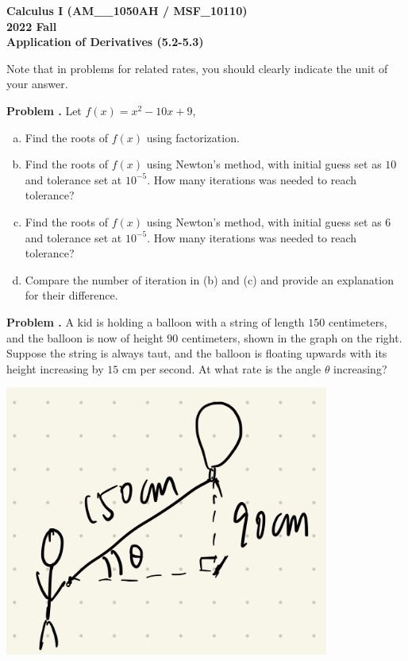 \documentclass[11pt,letterpaper]{article}
\newcounter{problem}
\newcommand{\problem}{
	\stepcounter{problem}%
	\noindent \textbf{Problem \theproblem. }%
}
\begin{document}
\noindent\textbf{\large Calculus I (AM\_\_1050AH / MSF\_10110) \\ 2022 Fall \\ Application of Derivatives (5.2-5.3)}

\bigskip

\noindent Note that in problems for related rates, you should clearly indicate the unit of your answer. 

\bigskip

\problem Let $f(x) = x^2 - 10x + 9$,
\begin{enumerate}[(a)]
    \item Find the roots of $f(x)$ using factorization.
    \item Find the roots of $f(x)$ using Newton's method, with initial guess set as $10$ and tolerance set at $10^{-5}$.  How many iterations was needed to reach tolerance?
    \item Find the roots of $f(x)$ using Newton's method, with initial guess set as $6$ and tolerance set at $10^{-5}$.  How many iterations was needed to reach tolerance?
    \item Compare the number of iteration in (b) and (c) and provide an explanation for their difference.
\end{enumerate}\vspace{6mm}


\noindent\begin{minipage}{0.7\textwidth}
    \problem A kid is holding a balloon with a string of length $150$ centimeters, and the balloon is now of height $90$ centimeters, shown in the graph on the right. Suppose the string is always taut, and the balloon is floating upwards with its height increasing by $15$ cm per second.  At what rate is the angle $\theta$ increasing?
\end{minipage}
\begin{minipage}{0.3\textwidth}
    \begin{center}
        \includegraphics[width = 0.8\textwidth]{../graph/A11.png}
    \end{center}
\end{minipage}
\vspace{6mm}
\end{document}
